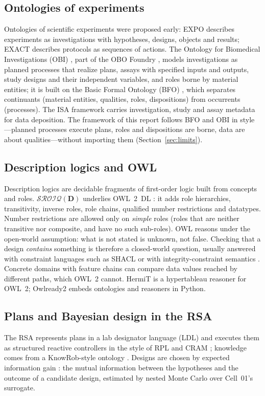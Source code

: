 \documentclass[10pt,a4paper]{article}
\begin{document}
\subsection{Ontologies of experiments}
Ontologies of scientific experiments were proposed early: EXPO \citep{soldatova2006} describes experiments as
investigations with hypotheses, designs, objects and results; EXACT \citep{soldatova2008} describes protocols as
sequences of actions. The Ontology for Biomedical Investigations (OBI) \citep{brinkman2010,bandrowski2016}, part of
the OBO Foundry \citep{smith2007}, models investigations as planned processes that realize plans, assays with
specified inputs and outputs, study designs and their independent variables, and roles borne by material entities;
it is built on the Basic Formal Ontology (BFO) \citep{arp2015}, which separates continuants (material entities,
qualities, roles, dispositions) from occurrents (processes). The ISA framework \citep{sansone2012} carries
investigation, study and assay metadata for data deposition. The framework of this report follows BFO and OBI in
style---planned processes execute plans, roles and dispositions are borne, data are about qualities---without
importing them (Section~\ref{sec:limits}).

\subsection{Description logics and OWL}
Description logics \citep{baader2003} are decidable fragments of first-order logic built from concepts and roles.
$\mathcal{SROIQ}(\mathbf{D})$ \citep{horrocks2006} underlies OWL~2~DL \citep{owl2}: it adds role hierarchies,
transitivity, inverse roles, role chains, qualified number restrictions and datatypes. Number restrictions are
allowed only on \emph{simple} roles (roles that are neither transitive nor composite, and have no such sub-roles).
OWL reasons under the open-world assumption: what is not stated is unknown, not false. Checking that a design
\emph{contains} something is therefore a closed-world question, usually answered with constraint languages such as
SHACL \citep{shacl2017} or with integrity-constraint semantics \citep{motik2009}. Concrete domains with feature chains
\citep{baader1991} can compare data values reached by different paths, which OWL~2 cannot. HermiT \citep{glimm2014} is
a hypertableau reasoner for OWL~2; Owlready2 \citep{lamy2017} embeds ontologies and reasoners in Python.

\subsection{Plans and Bayesian design in the RSA}
The RSA represents plans in a lab designator language (LDL) and executes them as structured reactive controllers in
the style of RPL and CRAM \citep{mcdermott1991,beetz2001,beetz2010}; knowledge comes from a KnowRob-style ontology
\citep{tenorth2013}. Designs are chosen by expected information gain \citep{lindley1956,chaloner1995}: the mutual
information between the hypotheses and the outcome of a candidate design, estimated by nested Monte Carlo over Cell~01's
surrogate.
\end{document}

